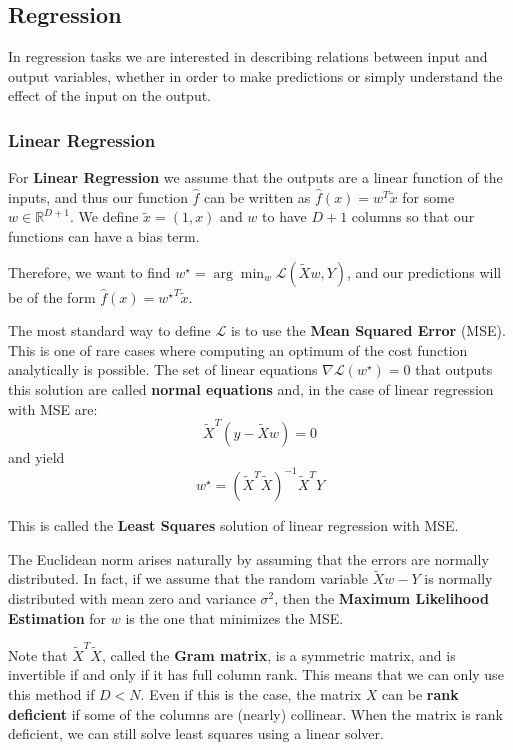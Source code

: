 \documentclass{article}
\newcommand{\R}{\mathbb{R}}
\newcommand{\loss}{\mathcal{L}}
\begin{document}
\subsection{Regression}

In regression tasks we are interested in describing relations between input and output variables, whether in order to make predictions or simply understand the effect of the input on the output.

\subsubsection{Linear Regression}

For \textbf{Linear Regression} we assume that the outputs are a linear function of the inputs, and thus our function $\hat{f}$ can be written as $\hat{f}(x) = w^T \tilde{x}$ for some $w \in \R^{D+1}$.
We define $\tilde{x} = (1, x)$ and $w$ to have $D+1$ columns so that our functions can have a bias term.

Therefore, we want to find $w^\star = \arg \min_w \loss(\tilde{X}w, Y)$, and our predictions will be of the form $\hat{f}(x) = {w^\star}^T \tilde{x}$.

The most standard way to define $\loss$ is to use the \textbf{Mean Squared Error} (MSE).
This is one of rare cases where computing an optimum of the cost function analytically is possible.
The set of linear equations $\nabla \loss(w^\star) = 0$ that outputs this solution are called \textbf{normal equations} and, in the case of linear regression with MSE are:
$$
\tilde{X}^T (y - \tilde{X}w) = 0
$$
and yield
$$
w^\star = (\tilde{X}^T \tilde{X})^{-1} \tilde{X}^T Y
$$

This is called the \textbf{Least Squares} solution of linear regression with MSE.

The Euclidean norm arises naturally by assuming that the errors are normally distributed.
In fact, if we assume that the random variable $\tilde{X}w - Y$ is normally distributed with mean zero and variance $\sigma^2$, then the \textbf{Maximum Likelihood Estimation} for $w$ is the one that minimizes the MSE.

Note that $\tilde{X}^T \tilde{X}$, called the \textbf{Gram matrix}, is a symmetric matrix, and is invertible if and only if it has full column rank.
This means that we can only use this method if $D < N$.
Even if this is the case, the matrix $X$ can be \textbf{rank deficient} if some of the columns are (nearly) collinear.
When the matrix is rank deficient, we can still solve least squares using a linear solver.
\end{document}
